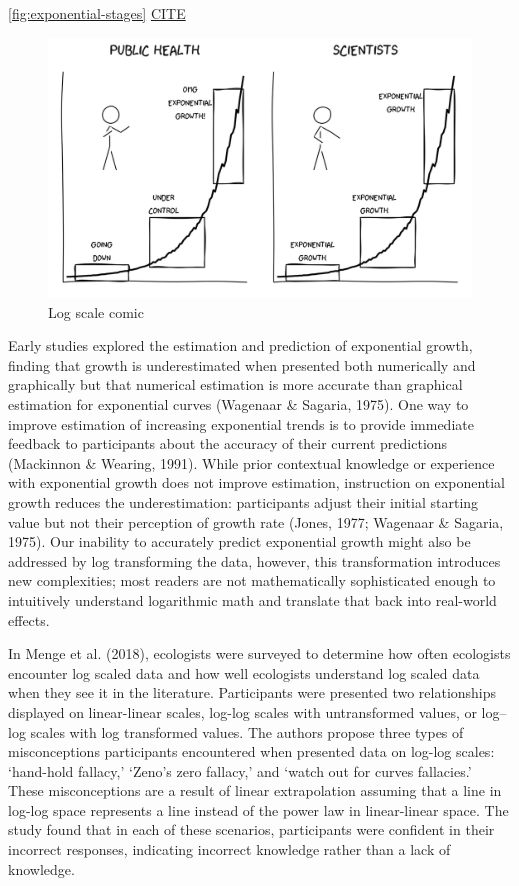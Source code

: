 \documentclass[print]{nuthesis}
\begin{document}
\cref{fig:exponential-stages} \href{https://twitter.com/MDrelichman/status/1402054093284143104}{CITE}

\begin{figure}[tbp]

{\centering \includegraphics[width=0.7\linewidth,]{images/exponential-stages-comic} 

}

\caption{Log scale comic}\label{fig:exponential-stages-comic}
\end{figure}

Early studies explored the estimation and prediction of exponential growth, finding that growth is underestimated when presented both numerically and graphically but that numerical estimation is more accurate than graphical estimation for exponential curves (Wagenaar \& Sagaria, 1975).
One way to improve estimation of increasing exponential trends is to provide immediate feedback to participants about the accuracy of their current predictions (Mackinnon \& Wearing, 1991).
While prior contextual knowledge or experience with exponential growth does not improve estimation, instruction on exponential growth reduces the underestimation: participants adjust their initial starting value but not their perception of growth rate (Jones, 1977; Wagenaar \& Sagaria, 1975).
Our inability to accurately predict exponential growth might also be addressed by log transforming the data, however, this transformation introduces new complexities; most readers are not mathematically sophisticated enough to intuitively understand logarithmic math and translate that back into real-world effects.

In Menge et al. (2018), ecologists were surveyed to determine how often ecologists encounter log scaled data and how well ecologists understand log scaled data when they see it in the literature.
Participants were presented two relationships displayed on linear-linear scales, log-log scales with untransformed values, or log--log scales with log transformed values.
The authors propose three types of misconceptions participants encountered when presented data on log-log scales: `hand-hold fallacy,' `Zeno's zero fallacy,' and `watch out for curves fallacies.'
These misconceptions are a result of linear extrapolation assuming that a line in log-log space represents a line instead of the power law in linear-linear space.
The study found that in each of these scenarios, participants were confident in their incorrect responses, indicating incorrect knowledge rather than a lack of knowledge.
\end{document}
